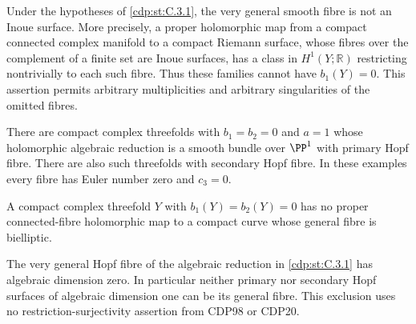 \begin{proposition}\label{cdp:st:C.3.12}


Under the hypotheses of \ref{cdp:st:C.3.1}, the very general smooth fibre is
not an Inoue surface. More precisely, a proper holomorphic map from
a compact connected complex manifold to a compact Riemann surface,
whose fibres over the complement of a finite set are Inoue surfaces,
has a class in $H^1(Y;\mathbb R)$ restricting nontrivially to each
such fibre. Thus these families cannot have $b_1(Y)=0$.
This assertion permits arbitrary multiplicities and arbitrary
singularities of the omitted fibres.
\end{proposition}

\begin{proposition}\label{cdp:st:C.3.6}


There are compact complex threefolds with $b_1=b_2=0$ and $a=1$
whose holomorphic algebraic reduction is a smooth bundle over
$\PP^1$ with primary Hopf fibre. There are also such threefolds
with secondary Hopf fibre. In these examples every fibre has Euler
number zero and $c_3=0$.
\end{proposition}

\begin{proposition}\label{cdp:st:C.3.7}


A compact complex threefold $Y$ with $b_1(Y)=b_2(Y)=0$ has no
proper connected-fibre holomorphic map to a compact curve whose
general fibre is bielliptic.
\end{proposition}

\begin{proposition}\label{cdp:st:C.3.8}


The very general Hopf fibre of the algebraic reduction in \ref{cdp:st:C.3.1}
has algebraic dimension zero. In particular neither primary nor
secondary Hopf surfaces of algebraic dimension one can be its
general fibre. This exclusion uses no restriction-surjectivity
assertion from CDP98 or CDP20.
\end{proposition}

